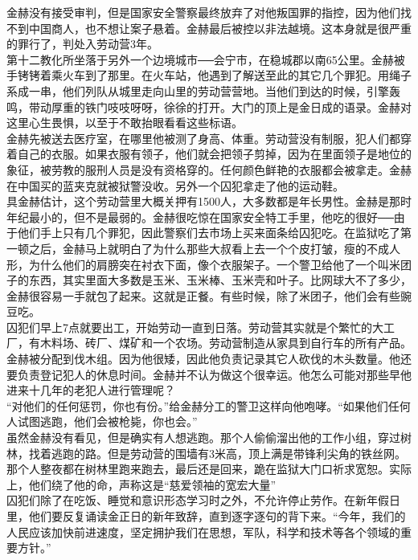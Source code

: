 金赫没有接受审判，但是国家安全警察最终放弃了对他叛国罪的指控，因为他们找不到中国商人，也不想让案子悬着。金赫最后被控以非法越境。这本身就是很严重的罪行了，判处入劳动营3年。\\

第十二教化所坐落于另外一个边境城市──会宁市，在稳城郡以南65公里。金赫被手铐铐着乘火车到了那里。在火车站，他遇到了解送至此的其它几个罪犯。用绳子系成一串，他们列队从城里走向山里的劳动营营地。当他们到达的时候，引擎轰鸣，带动厚重的铁门吱吱呀呀，徐徐的打开。大门的顶上是金日成的语录。金赫对这里心生畏惧，以至于不敢抬眼看看这些标语。\\

金赫先被送去医疗室，在哪里他被测了身高、体重。劳动营没有制服，犯人们都穿着自己的衣服。如果衣服有领子，他们就会把领子剪掉，因为在里面领子是地位的象征，被劳教的服刑人员是没有资格穿的。任何颜色鲜艳的衣服都会被拿走。金赫在中国买的蓝夹克就被狱警没收。另外一个囚犯拿走了他的运动鞋。\\

具金赫估计，这个劳动营里大概关押有1500人，大多数都是年长男性。金赫是那时年纪最小的，但不是最弱的。金赫很吃惊在国家安全特工手里，他吃的很好──由于他们手上只有几个罪犯，因此警察们去市场上买来面条给囚犯吃。在监狱吃了第一顿之后，金赫马上就明白了为什么那些大叔看上去一个个皮打皱，瘦的不成人形，为什么他们的肩膀突在衬衣下面，像个衣服架子。一个警卫给他了一个叫米团子的东西，其实里面大多数是玉米、玉米棒、玉米壳和叶子。比网球大不了多少，金赫很容易一手就包了起来。这就是正餐。有些时候，除了米团子，他们会有些豌豆吃。\\

囚犯们早上7点就要出工，开始劳动一直到日落。劳动营其实就是个繁忙的大工厂，有木料场、砖厂、煤矿和一个农场。劳动营制造从家具到自行车的所有产品。金赫被分配到伐木组。因为他很矮，因此他负责记录其它人砍伐的木头数量。他还要负责登记犯人的休息时间。金赫并不认为做这个很幸运。他怎么可能对那些早他进来十几年的老犯人进行管理呢？\\

“对他们的任何惩罚，你也有份。”给金赫分工的警卫这样向他咆哮。“如果他们任何人试图逃跑，他们会被枪毙，你也会。”\\

虽然金赫没有看见，但是确实有人想逃跑。那个人偷偷溜出他的工作小组，穿过树林，找着逃跑的路。但是劳动营的围墙有3米高，顶上满是带锋利尖角的铁丝网。那个人整夜都在树林里跑来跑去，最后还是回来，跪在监狱大门口祈求宽恕。实际上，他们绕了他的命，声称这是“慈爱领袖的宽宏大量”\\

囚犯们除了在吃饭、睡觉和意识形态学习时之外，不允许停止劳作。在新年假日里，他们要反复诵读金正日的新年致辞，直到逐字逐句的背下来。“今年，我们的人民应该加快前进速度，坚定拥护我们在思想，军队，科学和技术等各个领域的重要方针。”\\

